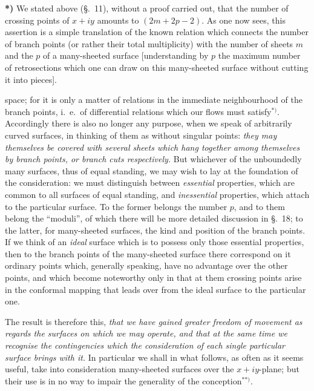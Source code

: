 \documentclass{article}
\begin{document}
\textbf{*)} We stated above (§.~11), without a proof carried out, that the number of crossing points of $x + iy$ amounts to $(2m + 2p - 2)$. As one now sees, this assertion is a simple translation of the known relation which connects the number of branch points (or rather their total multiplicity) with the number of sheets $m$ and the $p$ of a many-sheeted surface [understanding by $p$ the maximum number of retrosections which one can draw on this many-sheeted surface without cutting it into pieces].

space; for it is only a matter of relations in the immediate neighbourhood of the branch points, i.\ e.\ of differential relations which our flows must satisfy${}^{*)}$. Accordingly there is also no longer any purpose, when we speak of arbitrarily curved surfaces, in thinking of them as without singular points: \emph{they may themselves be covered with several sheets which hang together among themselves by branch points, or branch cuts respectively.} But whichever of the unboundedly many surfaces, thus of equal standing, we may wish to lay at the foundation of the consideration: we must distinguish between \emph{essential} properties, which are common to all surfaces of equal standing, and \emph{inessential} properties, which attach to the particular surface. To the former belongs the number $p$, and to them belong the “moduli”, of which there will be more detailed discussion in §.~18; to the latter, for many-sheeted surfaces, the kind and position of the branch points. If we think of an \emph{ideal} surface which is to possess only those essential properties, then to the branch points of the many-sheeted surface there correspond on it ordinary points which, generally speaking, have no advantage over the other points, and which become noteworthy only in that at them crossing points arise in the conformal mapping that leads over from the ideal surface to the particular one.

The result is therefore this, \emph{that we have gained greater freedom of movement as regards the surfaces on which we may operate, and that at the same time we recognise the contingencies which the consideration of each single particular surface brings with it.} In particular we shall in what follows, as often as it seems useful, take into consideration many-sheeted surfaces over the $x + iy$-plane; but their use is in no way to impair the generality of the conception${}^{**)}$.
\end{document}

